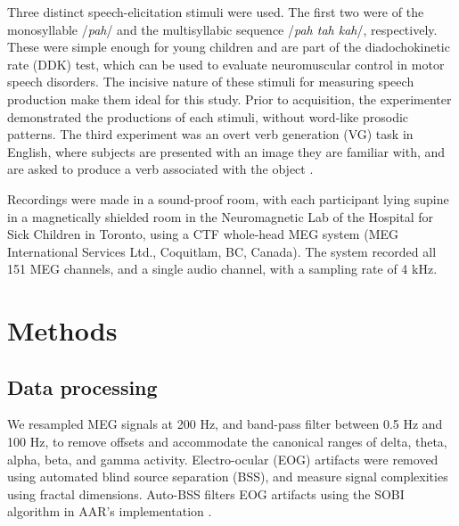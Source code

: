 \documentclass[utf8]{frontiersSCNS} %
\begin{document}

Three distinct speech-elicitation stimuli were used. The first two were of the monosyllable /{\em pah}/ and the multisyllabic sequence /{\em pah tah kah}/, respectively. These were simple enough for young children and are part of the diadochokinetic rate (DDK) test, which can be used to evaluate neuromuscular control in motor speech disorders. The incisive nature of these stimuli for measuring speech production make them ideal for this study. Prior to acquisition, the experimenter demonstrated the productions of each stimuli, without word-like prosodic patterns. The third experiment was an overt verb generation (VG) task in English, where subjects are presented with an image they are familiar with, and are asked to produce a verb associated with the object \cite{Doesburg2016}.

Recordings were made in a sound-proof room, with each participant lying supine in a magnetically shielded room in the Neuromagnetic Lab of the Hospital for Sick Children in Toronto, using a CTF whole-head MEG system (MEG International Services Ltd., Coquitlam, BC, Canada). The system recorded all 151 MEG channels, and a single audio channel, with a sampling rate of 4 kHz.

\section{Methods}


\subsection{Data processing}


We resampled MEG signals at 200 Hz, and band-pass filter between 0.5 Hz and 100 Hz, to remove offsets and accommodate the canonical ranges of delta, theta, alpha, beta, and gamma activity. Electro-ocular (EOG) artifacts were removed using automated blind source separation (BSS), and measure signal complexities using fractal dimensions. Auto-BSS filters EOG artifacts using the SOBI algorithm in AAR's implementation \cite{eog}.
\end{document}
